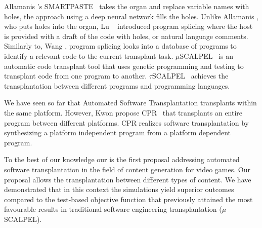 Allamanis \etal's SMARTPASTE~\cite{allamanis2017smartpaste} takes the organ and replace variable names with holes, the approach using a deep neural network fills the holes. 
Unlike Allamanis \etal, who puts holes into the organ, Lu \etal~\cite{lu2018program} introduced program splicing where the host is provided with a draft of the code with holes, or natural language comments. Similarly to, Wang \etal, program splicing looks into a database of programs to identify a relevant code to the current transplant task. 
$\mu$SCALPEL~\cite{barr2015automated} is an automatic code transplant tool that uses genetic programming and testing to transplant code from one program to another. 
$\tau$SCALPEL~\cite{marginean2021automated} achieves the transplantation between different programs and programming languages. 

We have seen so far that Automated Software Transplantation transplants within the same platform. However, Kwon \etal propose CPR~\cite{kwon2017cpr} that transplants an entire program between different platforms. CPR realizes software transplantation by synthesizing a platform independent program from a platform dependent program. 

To the best of our knowledge our is the first proposal addressing automated software transplantation in the field of content generation for video games. Our proposal allows the transplantation between different types of content. We have demonstrated that in this context the simulations yield superior outcomes compared to the test-based objective function that previously attained the most favourable results in traditional software engineering transplantation ($\mu$SCALPEL).

